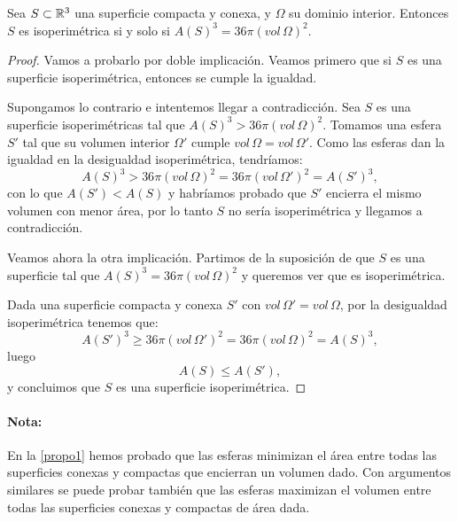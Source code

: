 \begin{corolario}
Sea $S \subset \mathbb{R}^3$ una superficie compacta y conexa, y $\Omega$ su dominio interior. Entonces $S$ es isoperimétrica si y solo si $A(S)^3 = 36\pi (vol \, \Omega)^2$.
\end{corolario}
\begin{proof}
Vamos a probarlo por doble implicación. Veamos primero que si $S$ es una superficie isoperimétrica, entonces se cumple la igualdad.

Supongamos lo contrario e intentemos llegar a contradicción. Sea $S$ es una superficie isoperimétricas tal que $A(S)^3 > 36\pi (vol \, \Omega)^2$. Tomamos una esfera $S'$ tal que su volumen interior $\Omega'$ cumple $vol \, \Omega = vol \, \Omega'$. Como las esferas dan la igualdad en la desigualdad isoperimétrica, tendríamos:
%
\begin{equation*}
    A(S)^3 > 36\pi (vol \, \Omega)^2 = 36\pi (vol \, \Omega')^2 = A(S')^3,
\end{equation*}
%
con lo que $A(S') < A(S)$ y habríamos probado que $S'$ encierra el mismo volumen con menor área, por lo tanto $S$ no sería isoperimétrica y llegamos a contradicción.

Veamos ahora la otra implicación. Partimos de la suposición de que $S$ es una superficie tal que $A(S)^3 = 36\pi (vol \, \Omega)^2$ y queremos ver que es isoperimétrica.

Dada una superficie compacta y conexa $S'$ con $vol \, \Omega' = vol \, \Omega$, por la desigualdad isoperimétrica tenemos que:
%
\begin{equation*}
    A(S')^3 \geq 36\pi (vol \, \Omega')^2 = 36\pi(vol \, \Omega)^2 = A(S)^3,
\end{equation*}
%
luego
%
\begin{equation*}
    A(S) \leq A(S'),
\end{equation*}
%
y concluimos que $S$ es una superficie isoperimétrica.
\end{proof}

\paragraph{Nota:} En la \ref{propo1} hemos probado que las esferas minimizan el área entre todas las superficies conexas y compactas que encierran un volumen dado. Con argumentos similares se puede probar también que las esferas maximizan el volumen entre todas las superficies conexas y compactas de área dada.

